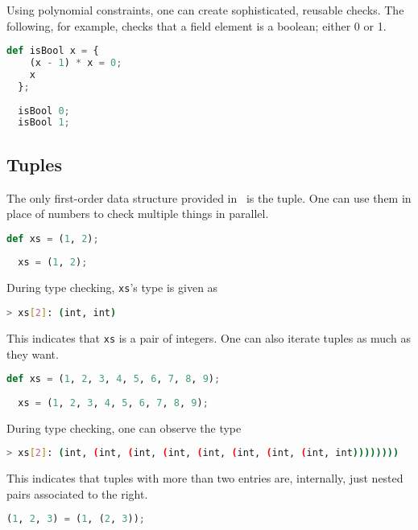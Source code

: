 Using polynomial constraints, one can create sophisticated, reusable checks. The following, for example, checks that a field element is a boolean; either 0 or 1.

\begin{lstlisting}[language=Python]
  def isBool x = { 
    (x - 1) * x = 0;
    x
  };
  
  isBool 0;
  isBool 1;
\end{lstlisting}






\subsection{Tuples} \label{TUP}

The only first-order data structure provided in \vampir\ is the tuple. One can use them in place of numbers to check multiple things in parallel.

\begin{lstlisting}[language=Python]
  def xs = (1, 2);
  
  xs = (1, 2);
\end{lstlisting}

During type checking, \lstinline{xs}'s type is given as

\begin{lstlisting}[language=bash]
  > xs[2]: (int, int)
\end{lstlisting}

This indicates that \lstinline{xs} is a pair of integers. One can also iterate tuples as much as they want.

\begin{lstlisting}[language=Python]
  def xs = (1, 2, 3, 4, 5, 6, 7, 8, 9);
  
  xs = (1, 2, 3, 4, 5, 6, 7, 8, 9);
\end{lstlisting}

During type checking, one can observe the type

\begin{lstlisting}[language=bash]
  > xs[2]: (int, (int, (int, (int, (int, (int, (int, (int, int))))))))
\end{lstlisting}

This indicates that tuples with more than two entries are, internally, just nested pairs associated to the right.

\begin{lstlisting}[language=Python]
  (1, 2, 3) = (1, (2, 3));
\end{lstlisting}

